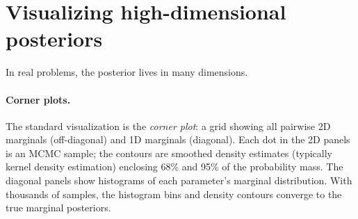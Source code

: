 \documentclass[11pt]{article}
\begin{document}






\section{Visualizing high-dimensional posteriors}

In real problems, the posterior lives in many dimensions.

\paragraph{Corner plots.} The standard visualization is the \emph{corner plot}: a grid showing all pairwise 2D marginals (off-diagonal) and 1D marginals (diagonal). Each dot in the 2D panels is an MCMC sample; the contours are smoothed density estimates (typically kernel density estimation) enclosing 68\% and 95\% of the probability mass. The diagonal panels show histograms of each parameter's marginal distribution. With thousands of samples, the histogram bins and density contours converge to the true marginal posteriors.
\end{document}
